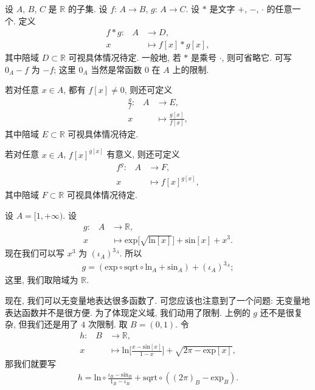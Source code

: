 \begin{definition}
    设 $A$, $B$, $C$ 是 $\mathbb{R}$ 的子集.
    设 $f$: $A \to B$, $g$: $A \to C$.
    设 $\ast$ 是文字 $+$, $-$, $\cdot$ 的任意一个.
    定义
    \begin{align*}
        \text{$f \ast g$:} \quad
        A & \to D,                  \\
        x & \mapsto f[x] \ast g[x],
    \end{align*}
    其中陪域 $D \subset \mathbb{R}$ 可视具体情况待定.
    一般地, 若 $\ast$ 是乘号 $\cdot$, 则可省略它.
    可写 $0_A - f$ 为 $-f$;
    这里 $0_A$ 当然是常函数 $0$ 在 $A$ 上的限制.

    若对任意 $x \in A$, 都有 $f[x] \neq 0$, 则还可定义
    \begin{align*}
        \text{$\frac{g}{f}$:} \quad
        A & \to E,                     \\
        x & \mapsto \frac{g[x]}{f[x]},
    \end{align*}
    其中陪域 $E \subset \mathbb{R}$ 可视具体情况待定.

    若对任意 $x \in A$, ${f[x]}^{g[x]}$ 有意义, 则还可定义
    \begin{align*}
        \text{${f}^{g}$:} \quad
        A & \to F,                 \\
        x & \mapsto {f[x]}^{g[x]},
    \end{align*}
    其中陪域 $F \subset \mathbb{R}$ 可视具体情况待定.
\end{definition}

\begin{example}
    设 $A = [1, +\infty)$. 设
    \begin{align*}
        \text{$g$:} \quad
        A & \to \mathbb{R},                                                                           \\
        x & \mapsto \mathrm{exp} {\bigg[ \sqrt{\mathrm{ln} {[x]}} \bigg]} + \mathrm{sin} {[x]} + x^3.
    \end{align*}
    现在我们可以写 $x^3$ 为 ${(\iota_A)}^{3_A}$.
    所以
    \begin{align*}
        g = (\mathrm{exp} \circ \mathrm{sqrt} \circ \mathrm{ln}_{A} + \mathrm{sin}_{A}) + {(\iota_A)}^{3_A};
    \end{align*}
    这里, 我们取陪域为 $\mathbb{R}$.
\end{example}

现在, 我们可以无变量地表达很多函数了.
可您应该也注意到了一个问题:
无变量地表达函数并不是很方便.
为了体现定义域, 我们动用了限制.
上例的 $g$ 还不是很复杂, 但我们还是用了 $4$ 次限制.
取 $B = (0, 1)$.
令
\begin{align*}
    \text{$h$:} \quad
    B & \to \mathbb{R},                                                                                              \\
    x & \mapsto \mathrm{ln} {\bigg[ \frac{x - \mathrm{sin} {[x]}}{1 - x} \bigg]} + \sqrt{2\pi - \mathrm{exp} {[x]}},
\end{align*}
那我们就要写
\begin{align*}
    h
    = \mathrm{ln} \circ \frac{\iota_B - \mathrm{sin}_B}{1_B - \iota_B}
    + \mathrm{sqrt} \circ ((2\pi)_B - \mathrm{exp}_B).
\end{align*}

